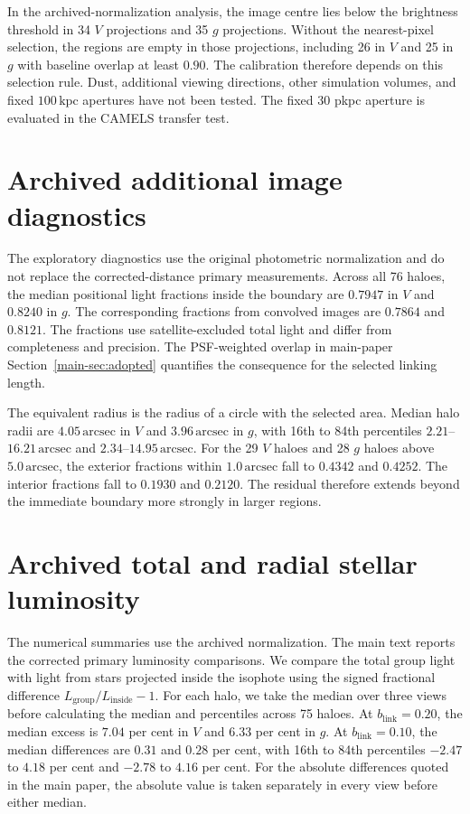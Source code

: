 \documentclass[usenatbib]{mnras}
\begin{document}
In the archived-normalization analysis, the image centre lies below the
brightness threshold in 34 $V$ projections and 35 $g$ projections.
Without the nearest-pixel selection, the regions are empty in those
projections, including 26 in $V$ and 25 in $g$ with baseline overlap at
least $0.90$. The calibration therefore depends on this selection rule.
Dust, additional viewing directions, other simulation volumes, and
fixed $100\,\mathrm{kpc}$ apertures have not been tested. The fixed
30 pkpc aperture is evaluated in the CAMELS transfer test.


\section{Archived additional image diagnostics}
The exploratory diagnostics use the original photometric normalization
and do not replace the corrected-distance primary measurements.
Across all 76 haloes, the median positional light fractions inside the
boundary are $0.7947$ in $V$ and $0.8240$ in $g$.
The corresponding fractions from convolved images are $0.7864$ and
$0.8121$.
The fractions use satellite-excluded total light and differ from completeness
and precision.
The PSF-weighted overlap in main-paper Section~\ref{main-sec:adopted} quantifies the consequence
for the selected linking length.

The equivalent radius is the radius of a circle with the selected area.
Median halo radii are $4.05\,\mathrm{arcsec}$ in $V$ and
$3.96\,\mathrm{arcsec}$ in $g$, with 16th to 84th percentiles
$2.21$--$16.21\,\mathrm{arcsec}$ and $2.34$--$14.95\,\mathrm{arcsec}$.
For the 29 $V$ haloes and 28 $g$ haloes above
$5.0\,\mathrm{arcsec}$, the exterior fractions within
$1.0\,\mathrm{arcsec}$ fall to $0.4342$ and $0.4252$.
The interior fractions fall to $0.1930$ and $0.2120$.
The residual therefore extends beyond the immediate boundary more
strongly in larger regions.

\section{Archived total and radial stellar luminosity}
The numerical summaries use the archived normalization. The main text
reports the corrected primary luminosity comparisons.
We compare the total group light with light from stars projected
inside the isophote using the signed fractional difference
$L_{\mathrm{group}}/L_{\mathrm{inside}}-1$.
For each halo, we take the median over three views before calculating
the median and percentiles across 75 haloes.
At $b_{\mathrm{link}}=0.20$, the median excess is $7.04$ per cent in $V$ and
$6.33$ per cent in $g$. At $b_{\mathrm{link}}=0.10$, the median differences are
$0.31$ and $0.28$ per cent, with 16th to 84th percentiles
$-2.47$ to $4.18$ per cent and $-2.78$ to $4.16$ per cent.
For the absolute differences quoted in the main paper, the absolute
value is taken separately in every view before either median.
\end{document}
